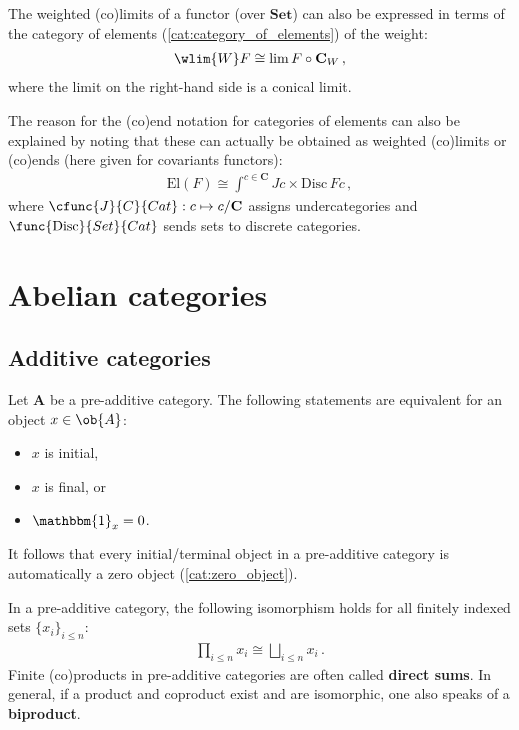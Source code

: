     \begin{property}
        The weighted (co)limits of a functor (over $\mathbf{Set}$) can also be expressed in terms of the category of elements (\cref{cat:category_of_elements}) of the weight:
        \begin{gather}
            \wlim{W}F\cong\lim F\circ\mathbf{C}_W\,,
        \end{gather}
        where the limit on the right-hand side is a conical limit.

        The reason for the (co)end notation for categories of elements can also be explained by noting that these can actually be obtained as weighted (co)limits or (co)ends (here given for covariants functors):
        \begin{gather}
            \mathrm{El}(F) \cong \int^{c\in\mathbf{C}}Jc\times\mathrm{Disc}\,Fc\,,
        \end{gather}
        where $\cfunc{J}{C}{Cat}:c\mapsto c/\mathbf{C}$ assigns undercategories and $\func{\mathrm{Disc}}{Set}{Cat}$ sends sets to discrete categories.
    \end{property}

\section{Abelian categories}\label{section:abelian_categories}
\subsection{Additive categories}


    \begin{property}
        Let $\mathbf{A}$ be a pre-additive category. The following statements are equivalent for an object $x\in\ob{A}$:
        \begin{itemize}
            \item $x$ is initial,
            \item $x$ is final, or
            \item $\mathbbm{1}_x = 0$.
        \end{itemize}
        It follows that every initial/terminal object in a pre-additive category is automatically a zero object (\cref{cat:zero_object}).
    \end{property}
    \begin{property}[Biproducts]
        In a pre-additive category, the following isomorphism holds for all finitely indexed sets $\{x_i\}_{i\leq n}$:
        \begin{gather}
            \prod_{i\leq n}x_i\cong\bigsqcup_{i\leq n}x_i\,.
        \end{gather}
        Finite (co)products in pre-additive categories are often called \textbf{direct sums}. In general, if a product and coproduct exist and are isomorphic, one also speaks of a \textbf{biproduct}.
    \end{property}

